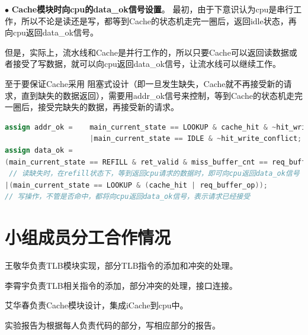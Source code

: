 \documentclass[11pt]{article}
\begin{document}
\noindent
$\bullet$
\textbf{Cache模块时向cpu的data\_ok信号设置}。
最初，由于下意识认为cpu是串行工作，所以不论是读还是写，都等到Cache的状态机走完一圈后，返回idle状态，再向cpu返回data\_ok信号。

但是，实际上，流水线和Cache是并行工作的，所以只要Cache可以返回读数据或者接受了写数据，就可以向cpu返回data\_ok信号，让流水线可以继续工作。

至于要保证Cache采用
阻塞式设计（即一旦发生缺失，Cache就不再接受新的请求，直到缺失的数据返回），需要用addr\_ok信号来控制，等到Cache的状态机走完一圈后，接受完缺失的数据，再接受新的请求。

\begin{lstlisting}[language=verilog]
assign addr_ok =    main_current_state == LOOKUP & cache_hit & ~hit_write_conflict      // 如果发生数据缺失，Cache拉低add_ok，不接受新的请求
                    |main_current_state == IDLE & ~hit_write_conflict;
assign data_ok =    
(main_current_state == REFILL & ret_valid & miss_buffer_cnt == req_buffer_offset[3:2] & ~req_buffer_op) 
 // 读缺失时，在refill状态下，等到返回cpu请求的数据时，即可向cpu返回data_ok信号
|(main_current_state == LOOKUP & (cache_hit | req_buffer_op)); 
// 写操作，不管是否命中，都将向cpu返回data_ok信号，表示请求已经接受
\end{lstlisting}


      
\vspace{1ex}

\section{小组成员分工合作情况}
王敬华负责TLB模块实现，部分TLB指令的添加和冲突的处理。

李霄宇负责TLB相关指令的添加，部分冲突的处理，接口连接。

艾华春负责Cache模块设计，集成iCache到cpu中。

实验报告为根据每人负责代码的部分，写相应部分的报告。
\end{document}
